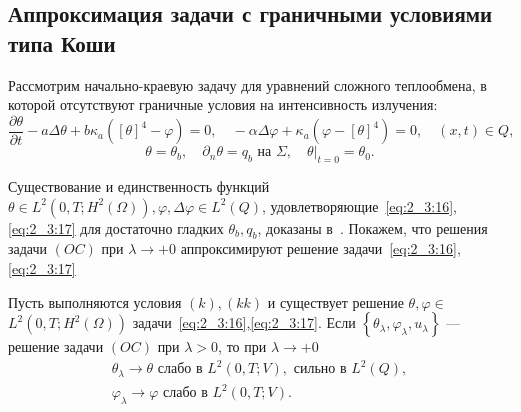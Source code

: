 \subsection{Аппроксимация задачи с граничными условиями типа Коши}
\label{subsec:ch2/sec3/approximation}
Рассмотрим начально-краевую задачу для уравнений сложного
теплообмена, в которой отсутствуют граничные условия на интенсивность излучения:
\begin{equation}
    \label{eq:2_3:16}
    \frac{\partial \theta}{\partial t}-a \Delta \theta
    + b \kappa_{a}\left([\theta]^{4}
    - \varphi\right)=0, \quad-\alpha \Delta \varphi
    + \kappa_{a}\left(\varphi-[\theta]^{4}\right) = 0,
    \quad(x, t) \in Q,
\end{equation}
\begin{equation}
    \label{eq:2_3:17}
    \theta=\theta_{b}, \quad \partial_{n} \theta= q_{b} \text { на } \Sigma,
    \left.\quad \theta\right|_{t=0} = \theta_{0}.
\end{equation}


Существование и единственность функций $\theta \in L^{2}\left(0, T; H^{2}(\Omega)\right),
\varphi, \Delta \varphi \in L^{2}( Q)$, удовлетворяющие~\eqref{eq:2_3:16},\eqref{eq:2_3:17}
для достаточно гладких $\theta_{b}, q_{b}$, доказаны в~\cite{Chebotarev2019Problem}.
Покажем, что решения задачи $(OC)$ при $\lambda \rightarrow+0$
аппроксимируют решение задачи~\eqref{eq:2_3:16},\eqref{eq:2_3:17}
\begin{theorem}
    \label{th:2_3:3}
    Пусть выполняются условия $(k), (kk)$ и существует решение
    $\theta, \varphi \in$ $L^{2}\left(0, T ; H^{2}(\Omega) \right)$
    задачи~\eqref{eq:2_3:16},\eqref{eq:2_3:17}.
    Если $\left\{\theta_{\lambda}, \varphi_{\lambda}, u_{\lambda}\right\}$
    — решение задачи $(OC)$ при $\lambda>0$, то при $\lambda\rightarrow+0$
    \[
        \begin{gathered}
            \theta_{\lambda} \rightarrow \theta \text { слабо в } L^{2}(0, T ; V),
            \text { сильно в } L^{2}(Q), \\
            \varphi_{\lambda} \rightarrow \varphi \text { слабо в } L^{2}(0, T ; V).
        \end{gathered}
    \]
\end{theorem}

